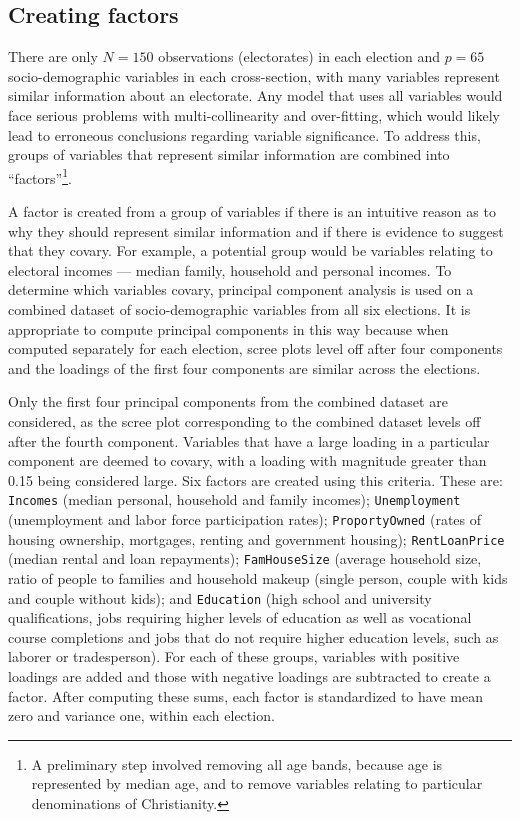 \documentclass[11pt,a4paper,]{article}
\begin{document}
\hypertarget{creating-factors}{%
\subsection{Creating factors}\label{creating-factors}}

There are only \(N = 150\) observations (electorates) in each election and \(p = 65\) socio-demographic variables in each cross-section, with many variables represent similar information about an electorate. Any model that uses all variables would face serious problems with multi-collinearity and over-fitting, which would likely lead to erroneous conclusions regarding variable significance. To address this, groups of variables that represent similar information are combined into ``factors''\footnote{A preliminary step involved removing all age bands, because age is represented by median age, and to remove variables relating to particular denominations of Christianity.}.

A factor is created from a group of variables if there is an intuitive reason as to why they should represent similar information and if there is evidence to suggest that they covary. For example, a potential group would be variables relating to electoral incomes --- median family, household and personal incomes. To determine which variables covary, principal component analysis is used on a combined dataset of socio-demographic variables from all six elections. It is appropriate to compute principal components in this way because when computed separately for each election, scree plots level off after four components and the loadings of the first four components are similar across the elections.

Only the first four principal components from the combined dataset are considered, as the scree plot corresponding to the combined dataset levels off after the fourth component. Variables that have a large loading in a particular component are deemed to covary, with a loading with magnitude greater than 0.15 being considered large. Six factors are created using this criteria. These are:
\texttt{Incomes} (median personal, household and family incomes);
\texttt{Unemployment} (unemployment and labor force participation rates);
\texttt{ProportyOwned} (rates of housing ownership, mortgages, renting and government housing);
\texttt{RentLoanPrice} (median rental and loan repayments);
\texttt{FamHouseSize} (average household size, ratio of people to families and household makeup (single person, couple with kids and couple without kids); and
\texttt{Education} (high school and university qualifications, jobs requiring higher levels of education as well as vocational course completions and jobs that do not require higher education levels, such as laborer or tradesperson).
For each of these groups, variables with positive loadings are added and those with negative loadings are subtracted to create a factor. After computing these sums, each factor is standardized to have mean zero and variance one, within each election.
\end{document}
